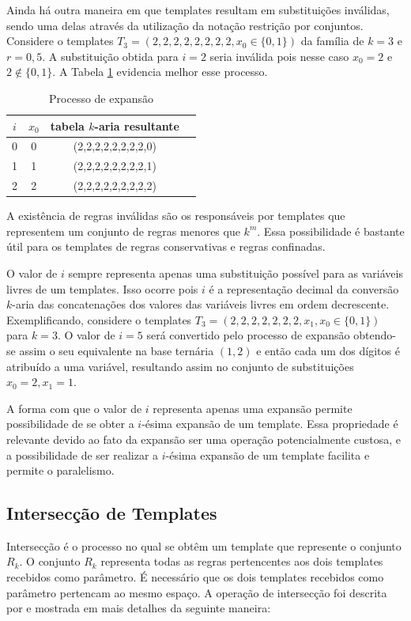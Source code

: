 \documentclass[12pt,a4paper]{article}
\begin{document}
	Ainda há outra maneira em que templates resultam em substituições inválidas, sendo uma delas através da utilização da notação restrição por conjuntos. Considere o templates $T_3 = (2,2,2,2,2,2,2,2,x_0\in \{0,1\})$ da família de $k=3$ e $r=0,5$. A substituição obtida para $i = 2$ seria inválida pois nesse caso $x_0 = 2$ e $2 \notin \{0,1\}$. A Tabela \ref{tab:invalideExpansion2} evidencia melhor esse processo.

	\begin{table}[h!]
	\centering
	\caption{Processo de expansão}
	{
		\vspace{0.3cm}
		\begin{tabular}{cccc}
		\hline
		$i$ & $x_0$ & tabela $k$-aria resultante \\
		\hline
		0	&	0	&	(2,2,2,2,2,2,2,2,0)	\\
		1	&	1	&	(2,2,2,2,2,2,2,2,1)	\\
		2	&	2	&	(2,2,2,2,2,2,2,2,2)	\\
		\hline
		\end{tabular}
	}
	\label{tab:invalideExpansion2}
	\end{table}

	A existência de regras inválidas são os responsáveis por templates que representem um conjunto de regras menores que $k^m$. Essa possibilidade é bastante útil para os templates de regras conservativas e regras confinadas.

	O valor de $i$ sempre representa apenas uma substituição possível para as variáveis livres de um templates. Isso ocorre pois $i$ é a representação decimal da conversão $k$-aria das concatenações dos valores das variáveis livres em ordem decrescente. Exemplificando, considere o templates $T_3 = (2,2,2,2,2,2,2,x_1,x_0\in \{0,1\})$ para $k=3$. O valor de $i=5$ será convertido pelo processo de expansão obtendo-se assim o seu equivalente na base ternária $(1,2)$ e então cada um dos dígitos é atribuído a uma variável, resultando assim no conjunto de substituições ${x_0=2,x_1=1}$.

	A forma com que o valor de $i$ representa apenas uma expansão permite possibilidade de se obter a $i$-ésima expansão de um template. Essa propriedade é relevante devido ao fato da expansão ser uma operação potencialmente custosa, e a possibilidade de ser realizar a $i$-ésima expansão de um template facilita e permite o paralelismo.

\newpage\newpage
\subsection{Intersecção de Templates}
	Intersecção é o processo no qual se obtêm um template que represente o conjunto $R_k$. O conjunto $R_k$ representa todas as regras pertencentes aos dois templates recebidos como parâmetro. É necessário que os dois templates recebidos como parâmetro pertencam ao mesmo espaço. A operação de intersecção foi descrita por  e mostrada em mais detalhes da seguinte maneira:
\end{document}
